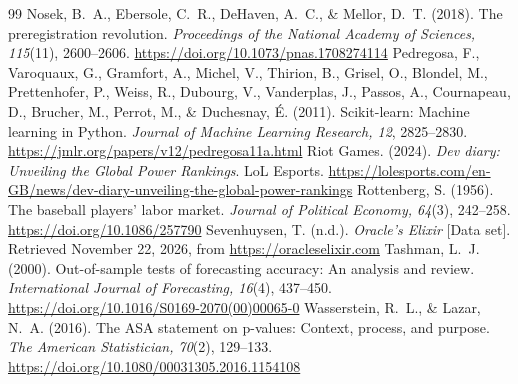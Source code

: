\documentclass[12pt,a4paper]{article}
\begin{document}
\begin{thebibliography}{99}
 Nosek, B.~A., Ebersole, C.~R., DeHaven, A.~C., \& Mellor, D.~T. (2018). The preregistration revolution. \emph{Proceedings of the National Academy of Sciences, 115}(11), 2600--2606. \url{https://doi.org/10.1073/pnas.1708274114}
 Pedregosa, F., Varoquaux, G., Gramfort, A., Michel, V., Thirion, B., Grisel, O., Blondel, M., Prettenhofer, P., Weiss, R., Dubourg, V., Vanderplas, J., Passos, A., Cournapeau, D., Brucher, M., Perrot, M., \& Duchesnay, \'E. (2011). Scikit-learn: Machine learning in Python. \emph{Journal of Machine Learning Research, 12}, 2825--2830. \url{https://jmlr.org/papers/v12/pedregosa11a.html}
 Riot Games. (2024). \emph{Dev diary: Unveiling the Global Power Rankings}. LoL Esports. \url{https://lolesports.com/en-GB/news/dev-diary-unveiling-the-global-power-rankings}
 Rottenberg, S. (1956). The baseball players' labor market. \emph{Journal of Political Economy, 64}(3), 242--258. \url{https://doi.org/10.1086/257790}
 Sevenhuysen, T. (n.d.). \emph{Oracle's Elixir} [Data set]. Retrieved November 22, 2026, from \url{https://oracleselixir.com}
 Tashman, L.~J. (2000). Out-of-sample tests of forecasting accuracy: An analysis and review. \emph{International Journal of Forecasting, 16}(4), 437--450. \url{https://doi.org/10.1016/S0169-2070(00)00065-0}
 Wasserstein, R.~L., \& Lazar, N.~A. (2016). The ASA statement on p-values: Context, process, and purpose. \emph{The American Statistician, 70}(2), 129--133. \url{https://doi.org/10.1080/00031305.2016.1154108}
\end{thebibliography}
\end{document}
